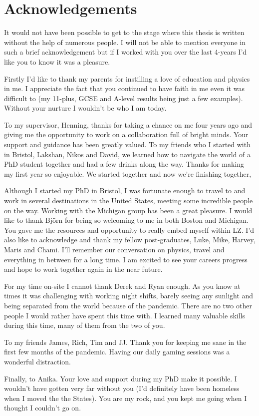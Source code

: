 %
%

\chapter*{Acknowledgements}
\begin{SingleSpace}
\par
It would not have been possible to get to the stage where this thesis is written without the help of numerous people.
I will not be able to mention everyone in such a brief acknowledgement but if I worked with you over the last 4-years I'd like you to know it was a pleasure.
\par
Firstly I'd like to thank my parents for instilling a love of education and physics in me. I appreciate the fact that you continued to have faith in me even it was difficult to (my 11-plus, GCSE and A-level results being just a few examples).
Without your nurture I wouldn't be who I am today.
\par
To my supervisor, Henning, thanks for taking a chance on me four years ago and giving me the opportunity to work on a collaboration full of bright minds. 
Your support and guidance has been greatly valued.
To my friends who I started with in Bristol, Lakshan, Nikos and David, we learned how to navigate the world of a PhD student together and had a few drinks along the way. 
Thanks for making my first year so enjoyable.
We started together and now we're finishing together,
\par
Although I started my PhD in Bristol, I was fortunate enough to travel  to and work in several destinations in the United States, meeting some incredible people on the way. Working with the Michigan group has been a great pleasure. 
I would like to thank Bj\"{o}rn for being so welcoming to me in both Boston and Michigan.
You gave me the resources and opportunity to really embed myself within LZ.
I'd also like to acknowledge and thank my fellow post-graduates, Luke, Mike, Harvey, Maris and Chami. I'll remember our conversation on physics, travel and everything in between for a long time. I am excited to see your careers progress and hope to work together again in the near future.
\par
For my time on-site I cannot thank Derek and Ryan enough. As you know at times it was challenging with working night shifts, barely seeing any sunlight and being separated from the world because of the pandemic. There are no two other people I would rather have spent this time with. I learned many valuable skills during this time, many of them from the two of you. 
\par
To my friends James, Rich, Tim and JJ.
Thank you for keeping me sane in the first few months of the pandemic.
Having our daily gaming sessions was a wonderful distraction.
\par
Finally, to Anika.
Your love and support during my PhD make it possible.
I wouldn't have gotten very far without you (I'd definitely have been homeless when I moved the the States).
You are my rock, and you kept me going when I thought I couldn't go on.
\end{SingleSpace}
\clearpage